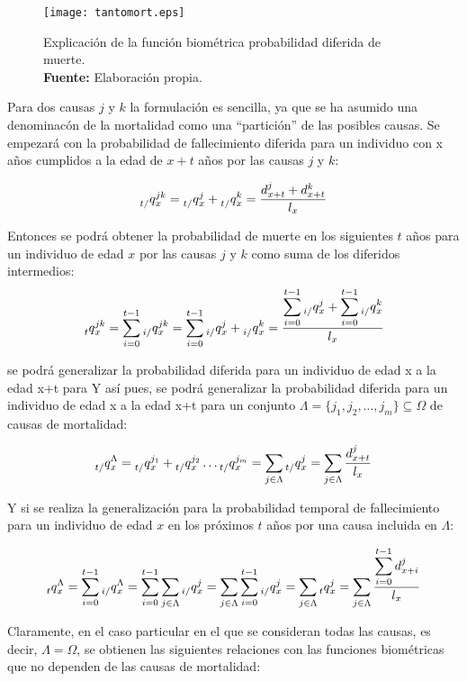 \documentclass{article}
\begin{document}
\begin{figure}[H]
\centering
\texttt{[image: tantomort.eps]}%
\caption{\centering Explicación de la función biométrica probabilidad diferida de muerte. \\ \textbf{Fuente:} Elaboración propia.}
\label{geog}
\end{figure}

Para dos causas $j$ y $k$ la formulación es sencilla, ya que se ha asumido una denominacón de la mortalidad como una ``partición'' de las posibles causas. Se empezará con la probabilidad de fallecimiento diferida para un individuo con x años cumplidos a la edad de $x+t$ años por las causas $j$ y $k$:

$$
\prescript{}{t/}q_{x}^{jk}=\prescript{}{t/}q_{x}^{j}+\prescript{}{t/}q_{x}^{k}=\frac{d_{x+t}^{j}+d_{x+t}^{k}}{l_{x}}
$$

Entonces se podrá obtener la probabilidad de muerte en los siguientes $t$ años para un individuo de edad $x$ por las causas $j$ y $k$ como suma de los diferidos intermedios:
$$
\prescript{}{t}q_{x}^{jk}=\sum_{i=0}^{t-1}\prescript{}{i/}q_{x}^{jk}=\sum_{i=0}^{t-1}\prescript{}{i/}q_{x}^{j}+\prescript{}{i/}q_{x}^{k}=\frac{\displaystyle\sum_{i=0}^{t-1}\prescript{}{i/}q_{x}^{j}+\sum_{i=0}^{t-1}\prescript{}{i/}q_{x}^{k}}{l_{x}}
$$

se podrá generalizar la probabilidad diferida para un individuo de edad x a la edad x+t para 
Y así pues, se podrá generalizar la probabilidad diferida para un individuo de edad x a la edad x+t para un conjunto $\Lambda=\{j_{1},j_{2},\dots,j_{m}\}\subseteq\Omega$ de causas de mortalidad:

$$
\prescript{}{t/}q_{x}^{\Lambda}=\prescript{}{t/}q_{x}^{j_{1}}+\prescript{}{t/}q_{x}^{j_{2}}\dots\prescript{}{t/}q_{x}^{j_{m}}=\sum_{j\in\Lambda}\prescript{}{t/}q_{x}^{j}=\sum_{j\in\Lambda}\frac{d_{x+t}^{j}}{l_{x}}
$$

Y si se realiza la generalización para la probabilidad temporal de fallecimiento para un individuo de edad $x$ en los próximos $t$ años por una causa incluida en $\Lambda$:

$$
\prescript{}{t}q_{x}^{\Lambda}=\sum_{i=0}^{t-1}\prescript{}{i/}q_{x}^{\Lambda}=\sum_{i=0}^{t-1}\sum_{j\in\Lambda}\prescript{}{i/}q_{x}^{j}=\sum_{j\in\Lambda}\sum_{i=0}^{t-1}\prescript{}{i/}q_{x}^{j}=\sum_{j\in\Lambda}\prescript{}{t}q_{x}^{j}=\sum_{j\in\Lambda}\frac{\displaystyle\sum_{i=0}^{t-1}d_{x+i}^{j}}{l_{x}}
$$

Claramente, en el caso particular en el que se consideran todas las causas, es decir, $\Lambda=\Omega$, se obtienen las siguientes relaciones con las funciones biométricas que no dependen de las causas de mortalidad:
\end{document}
